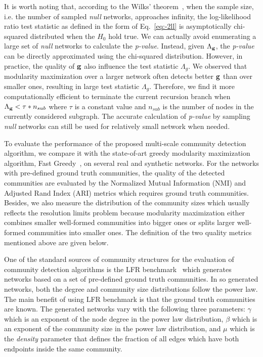 It is worth noting that, according to the Wilks' theorem~\cite{wilks1938large}, when the sample size, i.e. the number of sampled {\it null} networks, approaches infinity, the log-likelihood ratio test statistic as defined in the form of Eq.~\ref{eq:-2ll} is asymptotically chi-squared distributed when the $H_0$ hold true. We can actually avoid enumerating a large set of {\it null} networks to calculate the {\it p-value}. Instead, given $\Lambda_{\bf g}$, the {\it p-value} can be directly approximated using the chi-squared distribution. However, in practice, the quality of $\bf g$ also influence the test statistic $\Lambda_{g}$. We observed that modularity maximization over a larger network often detects better $\bf g$ than over smaller ones, resulting in large test statistic $\Lambda_{g}$. Therefore, we find it more computationally efficient to terminate the current recursion branch when $\Lambda_{\bf g} < \tau * n_{sub}$ where $\tau$ is a constant value and $n_{sub}$ is the number of nodes in the currently considered subgraph. The accurate calculation of {\it p-value} by sampling {\it null} networks can still be used for relatively small network when needed.

To evaluate the performance of the proposed multi-scale community detection algorithm, we compare it with the state-of-art greedy modularity maximization algorithm, Fast Greedy~\cite{clauset2004finding}, on several real and synthetic networks. For the networks with pre-defined ground truth communities, the quality of the detected communities are evaluated by the Normalized Mutual Information (NMI) and Adjusted Rand Index (ARI) metrics which requires ground truth communities. Besides, we also measure the distribution of the community sizes which usually reflects the resolution limits problem because modularity maximization either combines smaller well-formed communities into bigger ones or splits larger well-formed communities into smaller ones. The definition of the two quality metrics mentioned above are given below.

One of the standard sources of community structures for the evaluation of community detection algorithms is the LFR benchmark~\cite{lancichinetti2008benchmark} which generates networks based on a set of pre-defined ground truth communities. In so generated networks, both the degree and community size distributions follow the power law. The main benefit of using LFR benchmark is that the ground truth communities are known. The generated networks vary with the following three parameters: $\gamma$ which is an exponent of the node degree in the power law distribution, $\beta$ which is an exponent of the community size in the power law distribution, and $\mu$ which is the {\it density} parameter that defines the fraction of all edges which have both endpoints inside the same community. 

